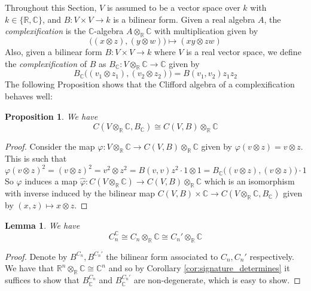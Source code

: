 \documentclass[12pt]{article}
\theoremstyle{plain}
\newtheorem{proposition}[thm]{Proposition}
\newtheorem{lemma}[thm]{Lemma}
\theoremstyle{definition}
\newcommand{\bb}[1]{\mathbb{#1}}
\newcommand{\lto}{\longrightarrow}
\begin{document}
	Throughout this Section, $V$ is assumed to be a vector space over $k$ with $k \in \lbrace \bb{R},\bb{C}\rbrace$, and $B: V \times V \lto k$ is a bilinear form.
	Given a real algebra $A$, the \emph{complexification} is the $\bb{C}$-algebra $A \otimes_\bb{R} \bb{C}$ with multiplication given by 
	\begin{equation}
		\big((x \otimes z),(y\otimes w)\big)\longmapsto (xy \otimes zw)
	\end{equation}
	Also, given a bilinear form $B: V \times V \lto k$ where $V$ is a real vector space, we define the \emph{complexification} of $B$ as $B_{\bb{C}}: V \otimes_{\bb{R}} \bb{C} \lto \bb{C}$ given by
	\begin{equation}
		B_{\bb{C}}\big((v_1 \otimes z_1),(v_2 \otimes z_2)\big) = B(v_1,v_2)z_1z_2
	\end{equation}
	The following Proposition shows that the Clifford algebra of a complexification behaves well:
	\begin{proposition}
		We have
		\begin{equation}
			C(V \otimes_{\bb{R}} \bb{C}, B_{\bb{C}}) \cong C(V,B) \otimes_{\bb{R}} \bb{C}
		\end{equation}
	\end{proposition}
	\begin{proof}
		Consider the map $\varphi: V \otimes_{\bb{R}}\bb{C} \lto C(V,B) \otimes_{\bb{R}} \bb{C}$ given by $\varphi(v \otimes z) = v \otimes z$. This is such that
		\begin{equation}
			\varphi(v \otimes z)^2 = (v \otimes z)^2 = v^2 \otimes z^2 = B(v,v)z^2 \cdot 1 \otimes 1 = B_{\bb{C}}\big((v\otimes z),(v\otimes z)\big)\cdot 1
		\end{equation}
		So $\varphi$ induces a map $\hat{\varphi}: C(V \otimes_{\bb{R}}\bb{C}) \lto C(V,B) \otimes_{\bb{R}} \bb{C}$ which is an isomorphism with inverse induced by the bilinear map $C(V,B) \times \bb{C} \lto C(V \otimes_{\bb{R} }\bb{C}, B_{\bb{C}})$ given by $(x,z) \longmapsto x \otimes z$.
	\end{proof}
	\begin{lemma}\label{lem:complexification}
		We have
		\begin{equation}
			C_n^{\bb{C}} \cong C_n \otimes_{\bb{R}} \bb{C} \cong C_n' \otimes_{\bb{R}} \bb{C}
		\end{equation}
	\end{lemma}
	\begin{proof}
		Denote by $B^{C_n}, B^{C_n'}$ the bilinear form associated to $C_n,C_{n}'$ respectively. We have that $\bb{R}^n \otimes_{\bb{R}}\bb{C} \cong \bb{C}^n$ and so by Corollary \ref{cor:signature_determines} it suffices to show that $B^{C_n}_{\bb{C}}$ and $B^{C_n'}_{\bb{C}}$ are non-degenerate, which is easy to show.
	\end{proof}
\end{document}
